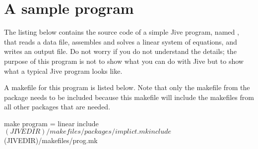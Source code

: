 
\section{A sample program}
\label{section:the-basics:sample-program}

The listing below contains the source code of a simple Jive program,
named , that reads a data file, assembles and solves a
linear system of equations, and writes an output file. Do not worry if
you do not understand the details; the purpose of this program is not to
show what you can do with Jive but to show what a typical Jive program
looks like.


A makefile for this program is listed below. Note that only the makefile
from the  package needs to be included because this
makefile will include the makefiles from all other packages that are
needed.

\begin{Source}{make}
  program = linear
  include $(JIVEDIR)/makefiles/packages/implict.mk
  include $(JIVEDIR)/makefiles/prog.mk
\end{Source}
